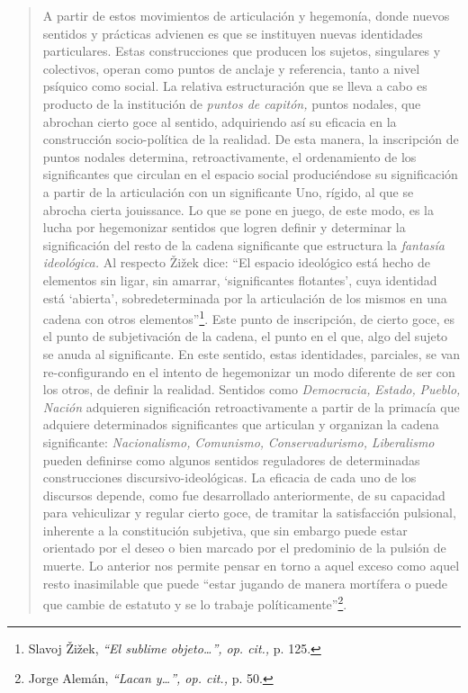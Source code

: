 \begin{quote}
A partir de estos movimientos de articulación y hegemonía, donde nuevos sentidos y prácticas advienen es que se instituyen nuevas identidades particulares. Estas construcciones que producen los sujetos, singulares y colectivos, operan como puntos de anclaje y referencia, tanto a nivel psíquico como social. La relativa estructuración que se lleva a cabo es producto de la institución de \emph{puntos de capitón,} puntos nodales, que abrochan cierto goce al sentido, adquiriendo así su eficacia en la construcción socio-política de la realidad. De esta manera, la inscripción de puntos nodales determina, retroactivamente, el ordenamiento de los significantes que circulan en el espacio social produciéndose su significación a partir de la articulación con un significante Uno, rígido, al que se abrocha cierta jouissance. Lo que se pone en juego, de este modo, es la lucha  por hegemonizar sentidos que logren definir y determinar la significación del resto de la cadena significante que estructura la \emph{fantasía ideológica.} Al respecto Žižek dice: \enquote{El espacio ideológico está hecho de elementos sin ligar, sin amarrar, \enquote{significantes flotantes}, cuya identidad está \enquote{abierta}, sobredeterminada por la articulación de los mismos en una cadena con otros elementos}\footnote{Slavoj Žižek, \emph{\enquote{El sublime objeto\ldots}, op. cit.,} p. 125.}. Este punto de inscripción, de cierto goce, es el punto de subjetivación de la cadena, el punto en el que, algo del sujeto se anuda al significante. En este sentido, estas identidades, parciales, se van re-configurando en el intento de hegemonizar un modo diferente de ser con los otros, de definir la realidad. Sentidos como \emph{Democracia,} \emph{Estado,} \emph{Pueblo,} \emph{Nación} adquieren significación retroactivamente a partir de la primacía que adquiere determinados significantes que articulan y organizan la cadena significante: \emph{Nacionalismo,} \emph{Comunismo,} \emph{Conservadurismo,} \emph{Liberalismo} pueden definirse como algunos sentidos reguladores de determinadas construcciones discursivo-ideológicas. La eficacia de cada uno de los discursos depende, como fue desarrollado anteriormente, de su capacidad para vehiculizar y regular cierto goce, de tramitar la satisfacción pulsional, inherente a la constitución subjetiva, que sin embargo puede estar orientado por el deseo o bien marcado por el predominio de la pulsión de muerte. Lo anterior nos permite pensar en torno a aquel exceso como aquel resto inasimilable que puede \enquote{estar jugando de manera mortífera o puede que cambie de estatuto y se lo trabaje políticamente}\footnote{Jorge Alemán, \emph{\enquote{Lacan y\ldots}, op. cit.,} p. 50.}.


\end{quote}
